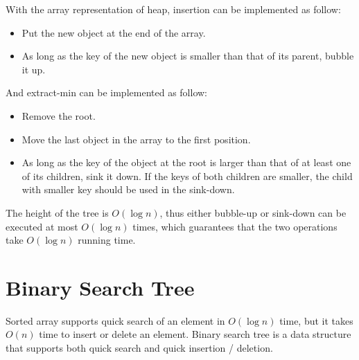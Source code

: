 With the array representation of heap, insertion can be implemented as follow:
\begin{itemize}
\item Put the new object at the end of the array.
\item As long as the key of the new object is smaller than that of its parent, bubble it up.
\end{itemize}
And extract-min can be implemented as follow:
\begin{itemize}
\item Remove the root.
\item Move the last object in the array to the first position.
\item As long as the key of the object at the root is larger than that of at least one of its children, sink it down. If the keys of both children are smaller, the child with smaller key should be used in the sink-down.
\end{itemize}
The height of the tree is $O(\log n)$, thus either bubble-up or sink-down can be executed at most $O(\log n)$ times, which guarantees that the two operations take $O(\log n)$ running time.
\section{Binary Search Tree}
Sorted array supports quick search of an element in $O(\log n)$ time, but it takes $O(n)$ time to insert or delete an element. Binary search tree is a data structure that supports both quick search and quick insertion / deletion. 
